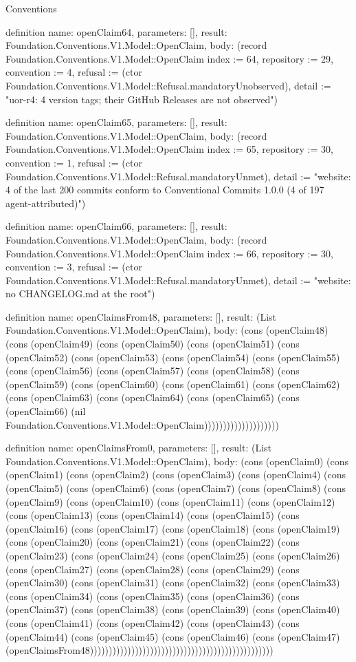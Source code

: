 \begin{lexlean}{Conventions}
\begin{semanticmodule}
definition{
  name: openClaim64,
  parameters: [],
  result: Foundation.Conventions.V1.Model::OpenClaim,
  body: (record Foundation.Conventions.V1.Model::OpenClaim {index := 64, repository := 29, convention := 4, refusal := (ctor Foundation.Conventions.V1.Model::Refusal.mandatoryUnobserved), detail := "uor-r4: 4 version tags; their GitHub Releases are not observed"})
}

definition{
  name: openClaim65,
  parameters: [],
  result: Foundation.Conventions.V1.Model::OpenClaim,
  body: (record Foundation.Conventions.V1.Model::OpenClaim {index := 65, repository := 30, convention := 1, refusal := (ctor Foundation.Conventions.V1.Model::Refusal.mandatoryUnmet), detail := "website: 4 of the last 200 commits conform to Conventional Commits 1.0.0 (4 of 197 agent-attributed)"})
}

definition{
  name: openClaim66,
  parameters: [],
  result: Foundation.Conventions.V1.Model::OpenClaim,
  body: (record Foundation.Conventions.V1.Model::OpenClaim {index := 66, repository := 30, convention := 3, refusal := (ctor Foundation.Conventions.V1.Model::Refusal.mandatoryUnmet), detail := "website: no CHANGELOG.md at the root"})
}

definition{
  name: openClaimsFrom48,
  parameters: [],
  result: (List Foundation.Conventions.V1.Model::OpenClaim),
  body: (cons (openClaim48) (cons (openClaim49) (cons (openClaim50) (cons (openClaim51) (cons (openClaim52) (cons (openClaim53) (cons (openClaim54) (cons (openClaim55) (cons (openClaim56) (cons (openClaim57) (cons (openClaim58) (cons (openClaim59) (cons (openClaim60) (cons (openClaim61) (cons (openClaim62) (cons (openClaim63) (cons (openClaim64) (cons (openClaim65) (cons (openClaim66) (nil Foundation.Conventions.V1.Model::OpenClaim))))))))))))))))))))
}

definition{
  name: openClaimsFrom0,
  parameters: [],
  result: (List Foundation.Conventions.V1.Model::OpenClaim),
  body: (cons (openClaim0) (cons (openClaim1) (cons (openClaim2) (cons (openClaim3) (cons (openClaim4) (cons (openClaim5) (cons (openClaim6) (cons (openClaim7) (cons (openClaim8) (cons (openClaim9) (cons (openClaim10) (cons (openClaim11) (cons (openClaim12) (cons (openClaim13) (cons (openClaim14) (cons (openClaim15) (cons (openClaim16) (cons (openClaim17) (cons (openClaim18) (cons (openClaim19) (cons (openClaim20) (cons (openClaim21) (cons (openClaim22) (cons (openClaim23) (cons (openClaim24) (cons (openClaim25) (cons (openClaim26) (cons (openClaim27) (cons (openClaim28) (cons (openClaim29) (cons (openClaim30) (cons (openClaim31) (cons (openClaim32) (cons (openClaim33) (cons (openClaim34) (cons (openClaim35) (cons (openClaim36) (cons (openClaim37) (cons (openClaim38) (cons (openClaim39) (cons (openClaim40) (cons (openClaim41) (cons (openClaim42) (cons (openClaim43) (cons (openClaim44) (cons (openClaim45) (cons (openClaim46) (cons (openClaim47) (openClaimsFrom48)))))))))))))))))))))))))))))))))))))))))))))))))
}


\end{semanticmodule}
\end{lexlean}
